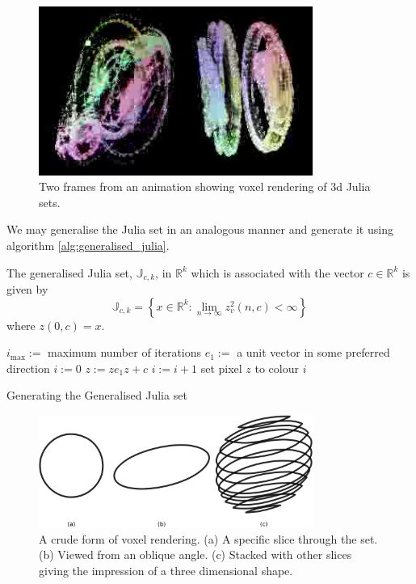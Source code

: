 \begin{figure}
\centering
\includegraphics[width=0.8\textwidth]{3djulia_pair}
\caption{\label{fig:3djulia}
  Two frames from an animation\cite{FRAC:JuliaAnimation} showing voxel
          rendering of 3d Julia sets.}
\end{figure}

We may generalise the Julia set in an analogous manner and generate it
using algorithm \ref{alg:generalised_julia}.

\begin{definition}
The generalised Julia set, $\mathbb{J}_{c,k}$, in $\mathbb{R}^k$
which is associated with the vector $c \in \mathbb{R}^k$ is given by
\[
\mathbb{J}_{c,k} = 
\left\{x \in \mathbb{R}^k
: \lim_{n \rightarrow \infty} z_v^2(n,c) < \infty \right\} 
\]
where $z(0,c) = x$.
\end{definition}

\begin{fancyalg}
\begin{algorithmic}[1]
\STATE $i_{\mathrm{max}} :=$ maximum number of iterations
\STATE $e_1 :=$ a unit vector in some preferred direction
\STATE $i := 0$
  \STATE $z := ze_1z + c$
  \STATE $i := i+1$
\ENDWHILE 
\STATE set pixel $z$ to colour $i$
\ENDFOR
\end{algorithmic}
\caption{
\label{alg:generalised_julia}
  Generating the Generalised Julia set}
\end{fancyalg}

\begin{figure}
\centering
\includegraphics[width=0.8\textwidth]{voxel}
\caption{\label{fig:voxel}
  A crude form of voxel rendering. (a) A specific slice through the set. (b) Viewed from
  an oblique angle. (c) Stacked with other slices giving the impression of a three
  dimensional shape.
}
\end{figure}

